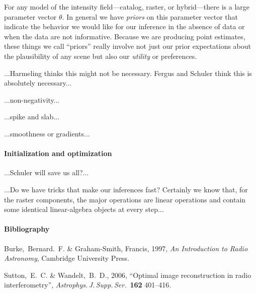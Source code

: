\documentclass[12pt]{article}
\begin{document}
For any model of the intensity field---catalog, raster, or
hybrid---there is a large parameter vector $\theta$.  In general we
have \emph{priors} on this parameter vector that indicate the behavior
we would like for our inference in the absence of data or when the
data are not informative.  Because we are producing point estimates,
these things we call ``priors'' really involve not just our prior
expectations about the plausibility of any scene but also our
\emph{utility} or preferences.

...Harmeling thinks this might not be necessary.  Fergus and Schuler
think this is absolutely necessary...

...non-negativity...

...spike and slab...

...smoothness or gradients...

\paragraph{Initialization and optimization}

...Schuler will save us all?...

...Do we have tricks that make our inferences fast?  Certainly we know
that, for the raster components, the major operations are linear
operations and contain some identical linear-algebra objects at every
step...

\paragraph{Bibliography}
\begin{trivlist}\raggedright
\item Burke,~Bernard.~F. \& Graham-Smith, Francis, 1997, \textit{An Introduction to Radio Astronomy}, Cambridge University Press.
\item Sutton,~E.~C. \& Wandelt,~B.~D., 2006, ``Optimal image reconstruction in radio interferometry'', \textit{Astrophys.\,J.\,Supp.\,Ser.}\ \textbf{162} 401--416.
\end{trivlist}
\end{document}
